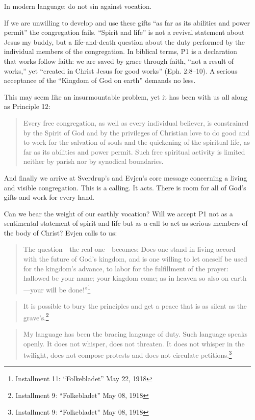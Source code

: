 In modern language: do not sin against vocation.

If we are unwilling to develop and use these gifts ``as far as its abilities and power permit'' the congregation fails. ``Spirit and life'' is not a revival statement about Jesus my buddy, but a life-and-death question about the duty performed by the individual members of the congregation. In biblical terms, P1 is a declaration that works follow faith: we are saved by grace through faith, ``not a result of works,'' yet “created in Christ Jesus for good works” (Eph. 2:8–10). A serious acceptance of the ``Kingdom of God on earth'' demands no less.  

This may seem like an insurmountable problem, yet it has been with us all along as Principle 12:

\begin{quote}
Every free congregation, as well as every individual believer, is constrained by the Spirit of God and by the privileges of Christian love to do good and to work for the salvation of souls and the quickening of the spiritual life, as far as its abilities and power permit. Such free spiritual activity is limited neither by parish nor by synodical boundaries.
\end{quote}

And finally we arrive at Sverdrup's and Evjen's core message concerning a living and visible congregation. This is a calling. It acts. There is room for all of God's gifts and work for every hand. 

Can we bear the weight of our earthly vocation? Will we accept P1 not as a sentimental statement of spirit and life but as a call to act as serious members of the body of Christ? Evjen calls to us:

\begin{quote}
The question—the real one—becomes: Does one stand in living accord with the future of God’s kingdom, and is one willing to let oneself be used for the kingdom’s advance, to labor for the fulfillment of the prayer: hallowed be your name; your kingdom come; as in heaven so also on earth—your will be done!”\footnote{Installment 11: “Folkebladet” May 22, 1918}
\end{quote}


\begin{quote}
It is possible to bury the principles and get a peace that is as silent as the grave’s.\footnote{Installment 9: “Folkebladet” May 08, 1918}
\end{quote}


\begin{quote}
My language has been the bracing language of duty. Such language speaks openly. It does
not whisper, does not threaten. It does not whisper in the twilight, does not compose protests
and does not circulate petitions.\footnote{Installment 9: “Folkebladet” May 08, 1918}
\end{quote}



